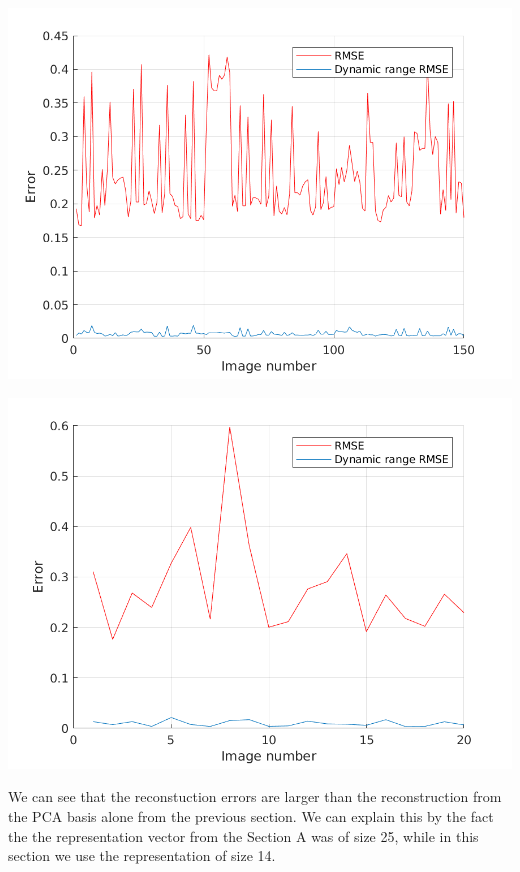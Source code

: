 \documentclass[a4paper]{iacas}
\begin{document}
\vskip 0.1in
\begin{minipage}{\linewidth}
	\centering
	\includegraphics[scale=0.9]{imgs2/rmse_train.png}
	\label{fig_1}
\end{minipage}
\vskip 0.1in
\begin{minipage}{\linewidth}
	\centering
	\includegraphics[scale=0.9]{imgs2/rmse_test.png}
	\label{fig_1}
\end{minipage}
\vskip 0.1in

We can see that the reconstuction errors are larger than the reconstruction from the PCA basis alone from the previous section. We can explain this by the fact the the representation vector from the Section A was of size 25, while in this section we use the representation of size 14.
\end{document}
